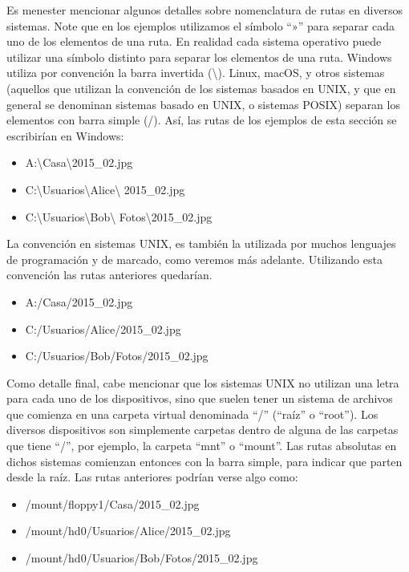 Es menester mencionar algunos detalles sobre nomenclatura de rutas en diversos
sistemas. Note que en los ejemplos utilizamos el símbolo ``»'' para separar cada
uno de los elementos de una ruta. En realidad cada sistema operativo puede
utilizar una símbolo distinto para separar los elementos de una ruta. Windows
utiliza por convención la barra invertida (\textbackslash). Linux, macOS, y
otros sistemas (aquellos que utilizan la convención de los sistemas basados en
UNIX, y que en general se denominan sistemas basado en UNIX, o sistemas POSIX)
separan los elementos con barra simple (/). Así, las rutas de los ejemplos de
esta sección se escribirían en Windows:
\begin{itemize}
    \item A:\textbackslash Casa\textbackslash 2015\_02.jpg
    \item C:\textbackslash Usuarios\textbackslash Alice\textbackslash
    2015\_02.jpg
    \item C:\textbackslash Usuarios\textbackslash Bob\textbackslash
    Fotos\textbackslash 2015\_02.jpg
\end{itemize}

La convención en sistemas UNIX, es también la utilizada por muchos lenguajes de
programación y de marcado, como veremos más adelante. Utilizando esta convención
las rutas anteriores quedarían.
\begin{itemize}
    \item A:/Casa/2015\_02.jpg
    \item C:/Usuarios/Alice/2015\_02.jpg
    \item C:/Usuarios/Bob/Fotos/2015\_02.jpg
\end{itemize}

Como detalle final, cabe mencionar que los sistemas UNIX no utilizan una letra
para cada uno de los dispositivos, sino que suelen tener un sistema de archivos
que comienza en una carpeta virtual denominada ``/'' (``raíz'' o ``root''). Los
diversos dispositivos son simplemente carpetas dentro de alguna de las carpetas
que tiene ``/'', por ejemplo, la carpeta ``mnt'' o ``mount''. Las rutas
absolutas en dichos sistemas comienzan entonces con la barra simple, para
indicar que parten desde la raíz. Las rutas anteriores podrían verse algo como:
\begin{itemize}
    \item /mount/floppy1/Casa/2015\_02.jpg
    \item /mount/hd0/Usuarios/Alice/2015\_02.jpg
    \item /mount/hd0/Usuarios/Bob/Fotos/2015\_02.jpg
\end{itemize}

